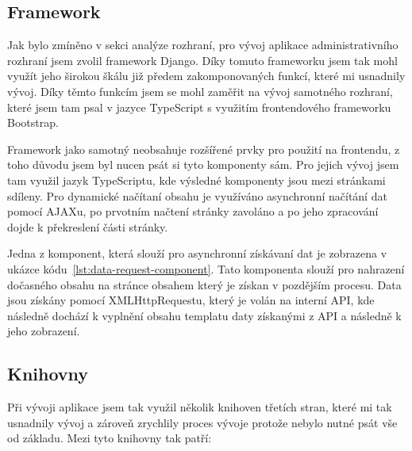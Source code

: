 \subsection{Framework}
\label{subsec:implementation-technologies-framework}
Jak bylo zmíněno v sekci analýze rozhraní, pro vývoj aplikace administrativního rozhraní jsem zvolil framework Django. Díky tomuto frameworku jsem tak mohl využít jeho širokou škálu již předem zakomponovaných funkcí, které mi usnadnily vývoj. Díky těmto funkcím jsem se mohl zaměřit na vývoj samotného rozhraní, které jsem tam psal v jazyce TypeScript s využitím frontendového frameworku Bootstrap.

Framework jako samotný neobsahuje rozšířené prvky pro použití na frontendu, z toho důvodu jsem byl nucen psát si tyto komponenty sám. Pro jejich vývoj jsem tam využil jazyk TypeScriptu, kde výsledné komponenty jsou mezi stránkami sdíleny. Pro dynamické načítaní obsahu je využíváno asynchronní načítání dat pomocí AJAXu, po prvotním načtení stránky zavoláno a po jeho zpracování dojde k překreslení části stránky.

Jedna z komponent, která slouží pro asynchronní získávaní dat je zobrazena v ukázce kódu~\ref{lst:data-request-component}. Tato komponenta slouží pro nahrazení dočasného obsahu na stránce obsahem který je získan v pozdějším procesu. Data jsou získány pomocí XMLHttpRequestu, který je volán na interní API, kde následně dochází k vyplnění obsahu templatu daty získanými z API a následně k jeho zobrazení.



\subsection{Knihovny}
\label{subsec:implementation-technologies-libraries}
Při vývoji aplikace jsem tak využil několik knihoven třetích stran, které mi tak usnadnily vývoj a zároveň zrychlily proces vývoje protože nebylo nutné psát vše od základu. Mezi tyto knihovny tak patří:

